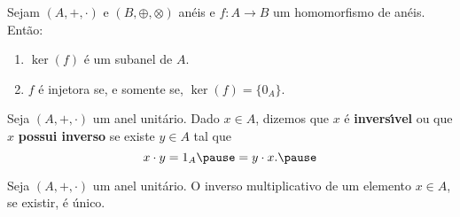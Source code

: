 \documentclass{beamer}
\begin{document}
    \begin{frame}
        \begin{proposicao}
            Sejam $(A, +, \cdot)$ e $(B, \oplus, \otimes)$ an\'eis \pause e $f : A \to B$ um homomorfismo de an\'eis. \pause Ent\~ao:\pause
            \begin{enumerate}[label={\roman*})]
                \item $\ker(f)$ \'e um subanel de $A$.\pause

                \vspace{.5cm}

                \item $f$ \'e injetora \pause se, e somente se, \pause $\ker(f) = \{0_A\}$.\pause

                \vspace{.5cm}
            \end{enumerate}
        \end{proposicao}
    \end{frame}

    \begin{frame}
        \begin{definicao}
            Seja $(A, +, \cdot)$ um anel unit\'ario. \pause Dado $x \in A$, \pause dizemos que $x$ \'e \textbf{invers{\'\i}vel} \pause ou que $x$ \textbf{possui inverso} \pause se existe $y \in A$ \pause tal que\pause
            \[
                x \cdot y = 1_A \pause = y \cdot x.\pause
            \]
        \end{definicao}
    \end{frame}

    \begin{frame}
        \begin{proposicao}
            Seja $(A, +, \cdot)$ um anel unit\'ario. \pause O inverso multiplicativo de um elemento $x \in A$, \pause se existir, \pause \'e \'unico.\pause
        \end{proposicao}
    \end{frame}
\end{document}
